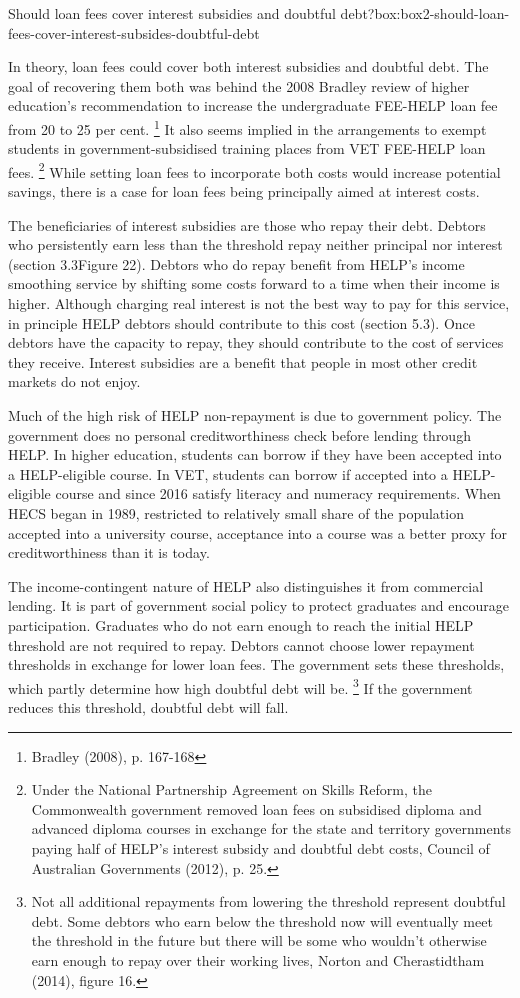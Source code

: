 \documentclass[embargoed]{grattan}
\begin{document}
\begin{bigbox*}{Should loan fees cover interest subsidies and doubtful debt?}{box:box2-should-loan-fees-cover-interest-subsides-doubtful-debt}

In theory, loan fees could cover both interest subsidies and doubtful debt.
The goal of recovering them both was behind the 2008 Bradley review of higher education's recommendation to increase the undergraduate FEE-HELP loan fee from 20 to 25 per cent.%
\footnote{Bradley (2008), p. 167-168} It also seems implied in the arrangements to exempt students in government-subsidised training places from VET FEE-HELP loan fees.%
\footnote{Under the National Partnership Agreement on Skills Reform, the Commonwealth government removed loan fees on subsidised diploma and advanced diploma courses in exchange for the state and territory governments paying half of HELP's interest subsidy and doubtful debt costs, Council of Australian Governments (2012), p. 25.} While setting loan fees to incorporate both costs would increase potential savings, there is a case for loan fees being principally aimed at interest costs.

The beneficiaries of interest subsidies are those who repay their debt.
Debtors who persistently earn less than the threshold repay neither principal nor interest (section 3.3Figure 22).
Debtors who do repay benefit from HELP's income smoothing service by shifting some costs forward to a time when their income is higher.
Although charging real interest is not the best way to pay for this service, in principle HELP debtors should contribute to this cost (section 5.3).
Once debtors have the capacity to repay, they should contribute to the cost of services they receive.
Interest subsidies are a benefit that people in most other credit markets do not enjoy.

Much of the high risk of HELP non-repayment is due to government policy.
The government does no personal creditworthiness check before lending through HELP.
In higher education, students can borrow if they have been accepted into a HELP-eligible course.
In VET, students can borrow if accepted into a HELP-eligible course and since 2016 satisfy literacy and numeracy requirements.
When HECS began in 1989, restricted to relatively small share of the population accepted into a university course, acceptance into a course was a better proxy for creditworthiness than it is today.

The income-contingent nature of HELP also distinguishes it from commercial lending.
It is part of government social policy to protect graduates and encourage participation.
Graduates who do not earn enough to reach the initial HELP threshold are not required to repay.
Debtors cannot choose lower repayment thresholds in exchange for lower loan fees.
The government sets these thresholds, which partly determine how high doubtful debt will be.%
\footnote{Not all additional repayments from lowering the threshold represent doubtful debt.
Some debtors who earn below the threshold now will eventually meet the threshold in the future but there will be some who wouldn't otherwise earn enough to repay over their working lives, Norton and Cherastidtham (2014), figure 16.} If the government reduces this threshold, doubtful debt will fall.


\end{bigbox*}
\end{document}
